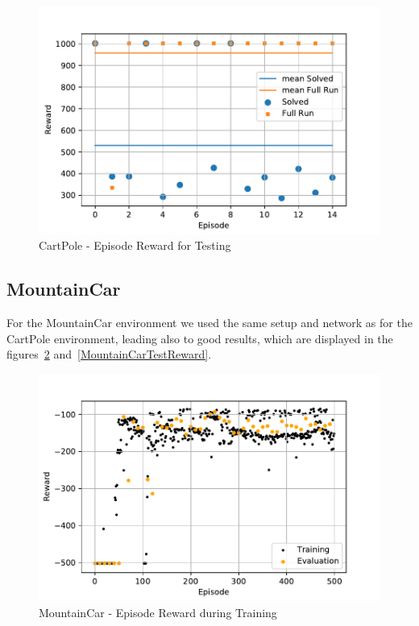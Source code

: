 \documentclass[
        a4paper,
        10pt,
        parskip = full,    %
    ]{scrartcl}
\begin{document}
\begin{figure}[H]
  \begin{center}
    \includegraphics{./images/CartPole-v0/tb_test_reward.pdf}
    \caption{CartPole - Episode Reward for Testing}
    \label{CartPoleTestReward}
  \end{center}
\end{figure}


\subsection{MountainCar}

For the MountainCar environment we used the same setup and network as for the
CartPole environment, leading also to good results, which are displayed in the
figures~\ref{MountainCarTrainEvalReward} and~\ref{MountainCarTestReward}.

\begin{figure}[H]
  \begin{center}
    \includegraphics{./images/MountainCar-v0/tb_train_eval_reward.pdf}
    \caption{MountainCar - Episode Reward during Training}
    \label{MountainCarTrainEvalReward}
  \end{center}
\end{figure}
\end{document}
